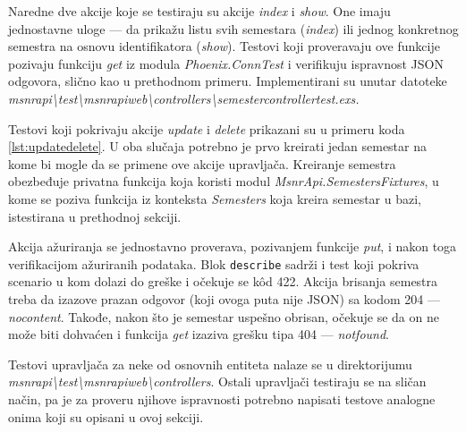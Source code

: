\documentclass[12pt,oneside]{memoir}
\begin{document}
\vspace*{1\baselineskip}
\par Naredne dve akcije koje se testiraju su akcije \emph{index} i \emph{show}. One imaju jednostavne uloge --- da prikažu listu svih semestara (\emph{index}) ili jednog konkretnog semestra na osnovu identifikatora (\emph{show}). Testovi koji proveravaju ove funkcije pozivaju funkciju \emph{get} iz modula \emph{Phoenix.ConnTest} i verifikuju ispravnost JSON odgovora, slično kao u prethodnom primeru. Implementirani su unutar datoteke \emph{msnr{\textunderscore}api{\textbackslash}test{\textbackslash}msnr{\textunderscore}api{\textunderscore}web{\textbackslash}controllers{\textbackslash}semester{\textunderscore}controller{\textunderscore}test.exs.}
\par Testovi koji pokrivaju akcije \emph{update} i \emph{delete} prikazani su u primeru koda \ref{lst:updatedelete}. U oba slučaja potrebno je prvo kreirati jedan semestar na kome bi  mogle da se primene ove akcije upravljača. Kreiranje semestra obezbeđuje privatna funkcija koja koristi modul \emph{MsnrApi.SemestersFixtures}, u kome se poziva funkcija iz konteksta \emph{Semesters} koja kreira semestar u bazi, istestirana u prethodnoj sekciji.
\par Akcija ažuriranja se jednostavno proverava, pozivanjem funkcije \emph{put}, i nakon toga verifikacijom ažuriranih podataka. Blok \texttt{describe} sadrži i test koji pokriva scenario u kom dolazi do greške i očekuje se  k\^{o}d 422. Akcija brisanja semestra treba da izazove prazan odgovor (koji ovoga puta nije JSON) sa kodom 204 --- \emph{no{\textunderscore}content}. Takođe, nakon što je semestar uspešno obrisan, očekuje se da on ne može biti dohvaćen i funkcija \emph{get} izaziva grešku tipa 404 --- \emph{not{\textunderscore}found}.
\par Testovi upravljača za neke od osnovnih entiteta nalaze se u direktorijumu \\ \emph{msnr{\textunderscore}api{\textbackslash}test{\textbackslash}msnr{\textunderscore}api{\textunderscore}web{\textbackslash}controllers}. Ostali upravljači testiraju se na sličan način, pa je za proveru njihove ispravnosti potrebno napisati testove analogne onima koji su  opisani u ovoj sekciji.  
\end{document}
